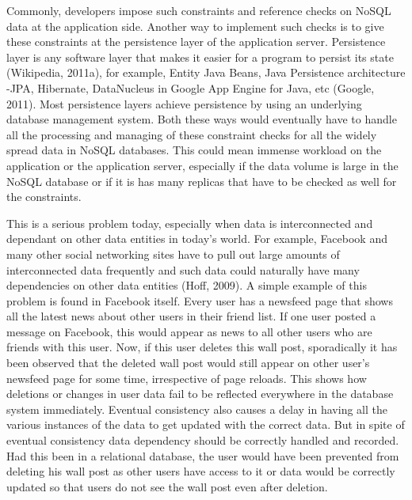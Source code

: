 Commonly, developers impose such constraints and reference checks on \ac{NoSQL} data
at the application side. Another way to implement such checks is to give these
constraints at the persistence layer of the application server. Persistence
layer is any software layer that makes it easier for a program to persist its
state (Wikipedia, 2011a), for example, Entity Java Beans, Java Persistence
architecture -JPA, Hibernate, DataNucleus in Google App Engine for Java, etc
(Google, 2011). Most persistence layers achieve persistence by using an
underlying database management system. Both these ways would eventually have to
handle all the processing and managing of these constraint checks for all the
widely spread data in \ac{NoSQL} databases. This could mean immense workload on the
application or the application server, especially if the data volume is large in
the \ac{NoSQL} database or if it is has many replicas that have to be checked as well
for the constraints.

This is a serious problem today, especially when data is interconnected and
dependant on other data entities in today’s world. For example, Facebook and
many other social networking sites have to pull out large amounts of
interconnected data frequently and such data could naturally have many
dependencies on other data entities (Hoff, 2009). A simple example of this
problem is found in Facebook itself. Every user has a newsfeed page that shows
all the latest news about other users in their friend list. If one user posted a
message on Facebook, this would appear as news to all other users who are
friends with this user. Now, if this user deletes this wall post, sporadically
it has been observed that the deleted wall post would still appear on other
user’s newsfeed page for some time, irrespective of page reloads. This shows how
deletions or changes in user data fail to be reflected everywhere in the
database system immediately. Eventual consistency also causes a delay in having
all the various instances of the data to get updated with the correct data. But
in spite of eventual consistency data dependency should be correctly handled and
recorded. Had this been in a relational database, the user would have been
prevented from deleting his wall post as other users have access to it or data
would be correctly updated so that users do not see the wall post even after
deletion.

